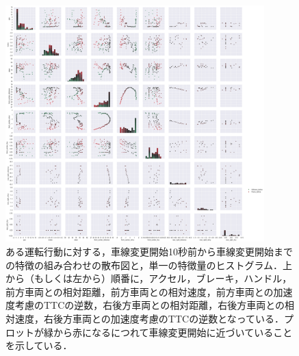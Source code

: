 \begin{figure}[htbp]
  \begin{center}
    \includegraphics[clip,width=10.0cm]{fig/pairplot_one_lc.png}
    \caption{ある運転行動に対する，車線変更開始10秒前から車線変更開始までの特徴の組み合わせの散布図と，単一の特徴量のヒストグラム．上から（もしくは左から）順番に，アクセル，ブレーキ，ハンドル，前方車両との相対距離，前方車両との相対速度，前方車両との加速度考慮のTTCの逆数，右後方車両との相対距離，右後方車両との相対速度，右後方車両との加速度考慮のTTCの逆数となっている．プロットが緑から赤になるにつれて車線変更開始に近づいていることを示している．}
    \label{fig:pairplot_one_lc}
  \end{center}
\end{figure}
